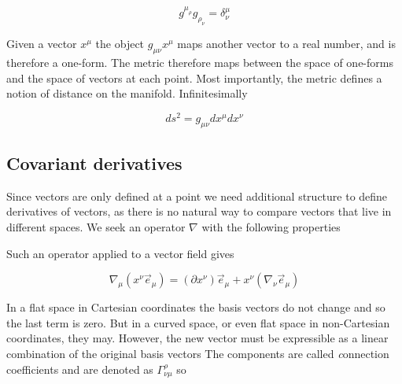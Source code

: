 \begin{equation*}
g^{\mu_\rho} g_{\rho_\nu} = \delta^\mu_\nu
\end{equation*}

Given a vector $x^\mu$ the object $g_{\mu\nu} x^\mu$ maps another
vector to a real number, and is therefore a one-form.  The metric
therefore maps between the space of one-forms and the space of vectors
at each point.  Most importantly, the metric defines a notion of
distance on the manifold.  Infinitesimally

\begin{equation}
ds^2 = g_{\mu\nu} dx^\mu dx^\nu
\end{equation}



\subsection{Covariant derivatives}

Since vectors are only defined at a point we need additional structure
to define derivatives of vectors, as there is no natural way to
compare vectors that live in different spaces.  We seek an operator
$\nabla$ with the following properties

\iffalse
\begin{list}
\item Maps ${m \choose n}$ tensors to ${m \choose {n+1}}$ tensors.
This is so we may consider the directional derivative of a tensor $T$
along a vector $x$ as $x^\mu \nabla_\mu T$.
\item Reduces to partial differentiation when applies to a scalar
field.
\item Linear.
\item Satisfies the Leibniz rule, $\nabla(a b) = a\nabla b + b \nabla a$.
\end{list}
\fi

Such an operator applied to a vector field gives

\begin{equation*}
\nabla_\mu (x^\nu \vec{e}_\mu)
= (\partial x^\nu) \vec{e}_\mu + x^\nu (\nabla_\nu \vec{e}_\mu)
\end{equation*}

In a flat space in Cartesian coordinates the basis vectors do not
change and so the last term is zero.  But in a curved space, or even
flat space in non-Cartesian coordinates, they may.  However, the new
vector must be expressible as a linear combination of the original
basis vectors  The components are called {\emph connection
coefficients} and are denoted as $\Gamma^\rho_{\nu\mu}$ so

